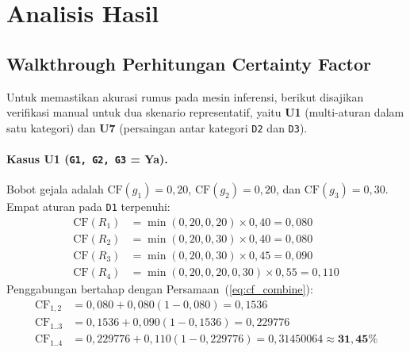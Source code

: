 \documentclass[12pt,a4paper]{report}
\begin{document}
\section{Analisis Hasil}

\subsection{Walkthrough Perhitungan Certainty Factor}
Untuk memastikan akurasi rumus pada mesin inferensi, berikut disajikan verifikasi manual untuk dua skenario representatif, yaitu \textbf{U1} (multi-aturan dalam satu kategori) dan \textbf{U7} (persaingan antar kategori \texttt{D2} dan \texttt{D3}).

\paragraph{Kasus U1 (\texttt{G1, G2, G3} = Ya).}
Bobot gejala adalah $\text{CF}(g_1)=0{,}20$, $\text{CF}(g_2)=0{,}20$, dan $\text{CF}(g_3)=0{,}30$. Empat aturan pada \texttt{D1} terpenuhi:
\begin{align*}
  \text{CF}(R_1) &= \min(0{,}20, 0{,}20) \times 0{,}40 = 0{,}080 \\
  \text{CF}(R_2) &= \min(0{,}20, 0{,}30) \times 0{,}40 = 0{,}080 \\
  \text{CF}(R_3) &= \min(0{,}20, 0{,}30) \times 0{,}45 = 0{,}090 \\
  \text{CF}(R_4) &= \min(0{,}20, 0{,}20, 0{,}30) \times 0{,}55 = 0{,}110
\end{align*}
Penggabungan bertahap dengan Persamaan~(\ref{eq:cf_combine}):
\begin{align*}
  \text{CF}_{1,2} &= 0{,}080 + 0{,}080(1 - 0{,}080) = 0{,}1536 \\
  \text{CF}_{1..3} &= 0{,}1536 + 0{,}090(1 - 0{,}1536) = 0{,}229776 \\
  \text{CF}_{1..4} &= 0{,}229776 + 0{,}110(1 - 0{,}229776) = 0{,}31450064 \approx \mathbf{31{,}45\%}
\end{align*}
\end{document}
